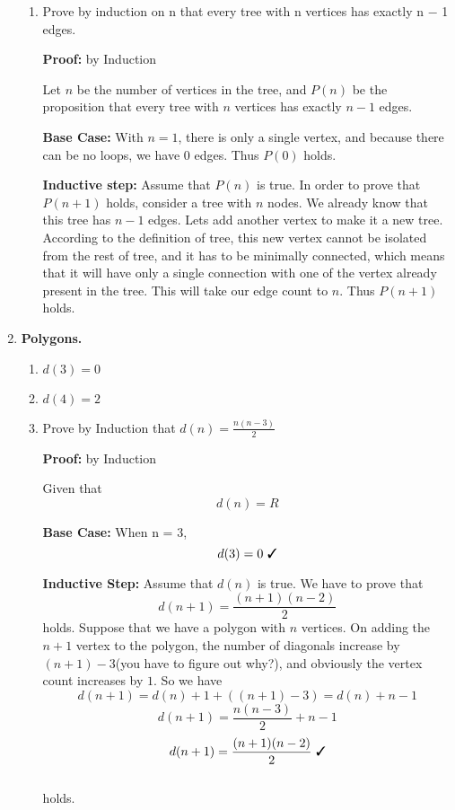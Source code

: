 \documentclass[11pt]{article}
\newcommand{\cmark}{\ding{51}}%
\begin{document}
\begin{enumerate}
\begin{enumerate}
				\item Prove by induction on n that every tree with n vertices has exactly n − 1 edges.
				
				\textbf{Proof:} by Induction
				
				Let $n$ be the number of vertices in the tree, and $P(n)$ be the proposition that every tree with $n$ vertices has exactly $n-1$ edges.  
				
				\textbf{Base Case:} With $n = 1$, there is only a single vertex, and because there can be no loops, we have $0$ edges. Thus $P(0)$ holds. \cmark
				
				\textbf{Inductive step:} Assume that $P(n)$ is true. In order to prove that $P(n+1)$ holds,  consider a tree with $n$ nodes. We already know that this tree has $n - 1$ edges. Lets add another vertex to make it a new tree. According to the definition of tree, this new vertex cannot be isolated from the rest of tree, and it has to be minimally connected, which means that it will have only a single connection with one of the vertex already present in the tree. This will take our edge count to $n$. Thus $P(n+1)$ holds. 
				
				
				
			\end{enumerate}
		\item \textbf{Polygons.}
			\begin{enumerate}
				\item $d(3) = 0$
				\item $d(4) = 2$
				\item Prove by Induction that $d(n) = \frac{n(n-3)}{2}$
				
				\textbf{Proof:} by Induction
				
				Given that $$d(n) = R$$
				
				\textbf{Base Case:} When n = 3, $$d(3) = 0 \text{   \cmark}$$ 
				
				\textbf{Inductive Step:} Assume that $d(n)$ is true. We have to prove that $$d(n+1) = \frac{(n+1)(n-2)}{2}$$ holds. Suppose that we have a polygon with $n$ vertices. On adding the $n + 1$ vertex to the polygon, the number of diagonals increase by $(n+1)-3$(you have to figure out why?), and obviously the vertex count increases by $1$. So we have 
				$$d(n+1) = d(n) + 1 + ((n+1)-3)= d(n) + n - 1$$ 
				$$d(n+1)= \frac{n(n-3)}{2} + n - 1$$  
				$$d(n+1) = \frac{(n+1)(n-2)}{2} \text{        \cmark}$$ 
				\\ holds. 
				 

\end{enumerate}
\end{enumerate}
\end{document}

